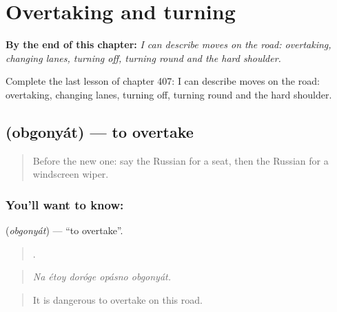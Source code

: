 
\chapter{Overtaking and turning}
\label{ch:ru-overtaking-and-turning}

\begin{chapteropening}
\textbf{By the end of this chapter:} \emph{I can describe moves on the road: overtaking, changing lanes, turning off, turning round and the hard shoulder.}

Complete the last lesson of chapter 407: I can describe moves on the road: overtaking, changing lanes, turning off, turning round and the hard shoulder.
\end{chapteropening}

\section[\texorpdfstring{\ru{обгонять} (obgonyát)}{обгонять (obgonyát)}]{ (obgonyát) — to overtake}

\label{lesson:RU-C407-obgonyat}



\begin{quote}
Before the new one: say the Russian for a seat, then the Russian for a windscreen wiper.
\end{quote}

\subsection*{You'll want to know: }
\textbf{} (\emph{obgonyát}) — \textquotedblleft{}to overtake\textquotedblright{}.

\begin{quote}
    .
\end{quote}

\begin{quote}
\emph{Na étoy doróge opásno obgonyát.}
\end{quote}

\begin{quote}
It is dangerous to overtake on this road.
\end{quote}

